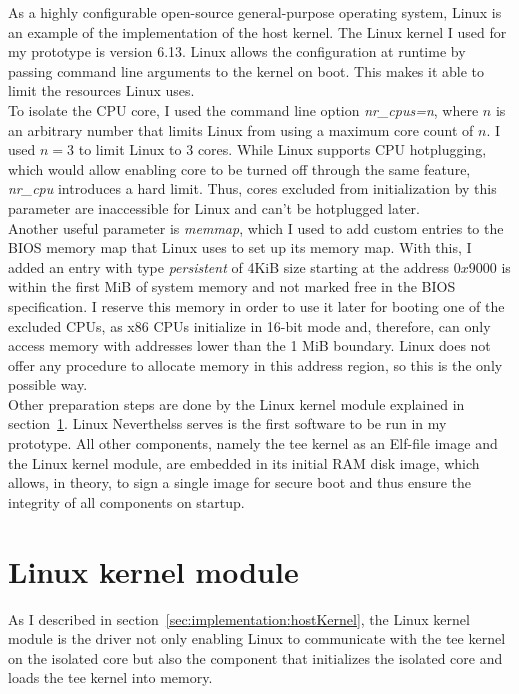 As a highly configurable open-source general-purpose operating system, Linux is
an example of the implementation of the host kernel. The Linux kernel I used for
my prototype is version 6.13. Linux allows the configuration at runtime by
passing command line arguments to the kernel on boot. This makes it able to
limit the resources Linux uses. \\

To isolate the CPU core, I used the command line option \textit{nr\_cpus=n},
where $n$ is an arbitrary number that limits Linux from using a maximum core
count of $n$. I used $n=3$ to limit Linux to 3 cores. While Linux supports CPU
hotplugging, which would allow enabling core to be turned off through
the same feature, \textit{nr\_cpu} introduces a hard limit. Thus, cores excluded
from initialization by this parameter are inaccessible for Linux and can't be
hotplugged later. \\

Another useful parameter is \textit{memmap}, which I used to add custom entries
to the BIOS memory map that Linux uses to set up its memory map. With this, I
added an entry with type \textit{persistent} of 4KiB size starting at the
address $0x9000$ is within the first MiB of system memory and not marked free in
the BIOS specification. I reserve this memory in order to use it
later for booting one of the excluded CPUs, as x86 CPUs initialize in 16-bit
mode and, therefore, can only access memory with addresses lower than the 1 MiB
boundary. Linux does not offer any procedure to allocate memory in this address
region, so this is the only possible way. \\

Other preparation steps are done by the Linux kernel module explained in
section~\ref{sec:implementation:kmod}. Linux Neverthelss serves is the first
software to be run in my prototype. All other components, namely the \gls{tee}
kernel as an Elf-file image and the Linux kernel module, are embedded in its
initial RAM disk image, which allows, in theory, to sign a single image for
secure boot and thus ensure the integrity of all components on startup.\\

\section{Linux kernel module}
\label{sec:implementation:kmod}
As I described in section~\ref{sec:implementation:hostKernel}, the Linux kernel
module is the driver not only enabling Linux to communicate with the \gls{tee}
kernel on the isolated core but also the component that initializes the isolated
core and loads the \gls{tee} kernel into memory.\\

